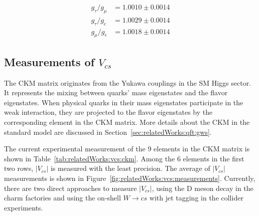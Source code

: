 \begin{align*}
    g_\tau / g_\mu &= 1.0010 \pm 0.0014 \\
    g_\tau / g_e   &= 1.0029 \pm 0.0014 \\
    g_\mu  / g_e   &= 1.0018 \pm 0.0014 
\end{align*}





\subsection{Measurements of $V_{cs}$ }

The CKM matrix originates from the Yukawa couplings in the SM Higgs sector. It represents the mixing between quarks' mass eigenstates and the flavor eigenstates. When physical quarks in their mass eigenstates participate in the weak interaction, they are projected to the flavor eigenstates by the corresponding element in the CKM matrix. More details about the CKM in the standard model are discussed in Section~\ref{sec:relatedWorks:qft:gws}. 

\begin{table}[ht]
    \centering
    \setlength{\tabcolsep}{1.5em}
    \renewcommand{\arraystretch}{1.5}
    \caption{The current experimental world average of the 9 elements in the CKM matrix in the PDG \cite{pdg2020}.  }
    \label{tab:relatedWorks:vcs:ckm}
\end{table}


The current experimental measurement of the 9 elements in the CKM matrix \cite{pdg2020} is shown in Table~\ref{tab:relatedWorks:vcs:ckm}. Among the 6 elements in the first two rows, $|V_{cs}|$ is measured with the least precision. The average of $|V_{cs}|$ measurements is shown in Figure~\ref{fig:relatedWorks:vcs:measurements}. Currently, there are two direct approaches to measure $|V_{cs}|$, using the D meson decay in the charm factories and using the on-shell $W\to c s$  with jet tagging in the collider experiments.

